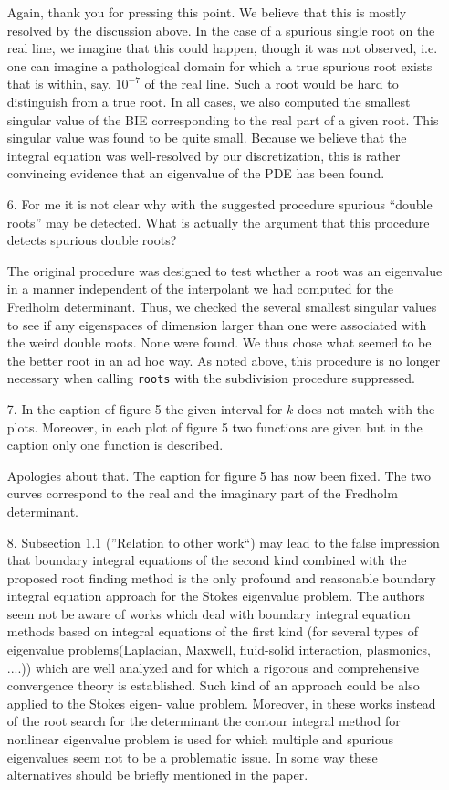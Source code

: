 \documentclass{article}
\begin{document}
\begin{itemize}
Again, thank you for pressing this point. We believe that this
is mostly resolved by the discussion above. In the case of a spurious
single root on the real line, we imagine that this could happen, though it
was not observed, i.e. one can imagine a pathological domain for which a
true spurious root exists that is within, say, $10^{-7}$ of the real line.
Such a root would be hard to distinguish from a true root.
In all cases, we also computed the smallest singular
value of the BIE corresponding to the real part of a given root.
This singular value was found to be quite small. Because we believe
that the integral equation was well-resolved
by our discretization, this is rather convincing evidence that an
eigenvalue of the PDE has been found.

\item[6.] {\color{blue}
  For me it is not clear why with the suggested procedure spurious ``double roots''
  may be detected. What is actually the argument that this
  procedure detects spurious double roots?}

The original procedure was designed to test whether a root was
an eigenvalue in a manner independent of the interpolant we had
computed for the Fredholm determinant. Thus, we checked the several smallest
singular values to see if any eigenspaces of dimension larger
than one were associated
with the weird double roots. None were found. We thus chose what
seemed to be the better root in an ad hoc way. As noted above, this
procedure is no longer necessary when calling \texttt{roots} with
the subdivision procedure suppressed.

\item[7.] {\color{blue}In the caption of figure 5 the given interval for $k$
  does not match with the plots. Moreover, in each plot of figure
  5 two functions are given but in the caption only one function is described.}

Apologies about that. The caption for figure 5 has now been fixed. The two curves
correspond to the real and the imaginary part of the Fredholm determinant. 

\item[8.] {\color{blue}Subsection 1.1 (”Relation to other work“) may
  lead to the false impression that boundary integral equations of the
  second kind combined with the proposed root finding method is the only
  profound and reasonable boundary integral equation approach for the Stokes
  eigenvalue problem. The authors seem not be aware of works which deal with
  boundary integral equation methods based on integral equations of the
  first kind (for several types of eigenvalue problems(Laplacian, Maxwell,
  fluid-solid interaction, plasmonics, ....)) which are well analyzed and for
  which a rigorous and comprehensive convergence theory is established.
  Such kind of an approach could be also applied to the Stokes eigen-
  value problem. Moreover, in these works instead of the root search for
  the determinant the contour integral method for nonlinear eigenvalue
  problem is used for which multiple and spurious eigenvalues seem not
  to be a problematic issue. In some way these alternatives should be
  briefly mentioned in the paper.}


\end{itemize}
\end{document}
